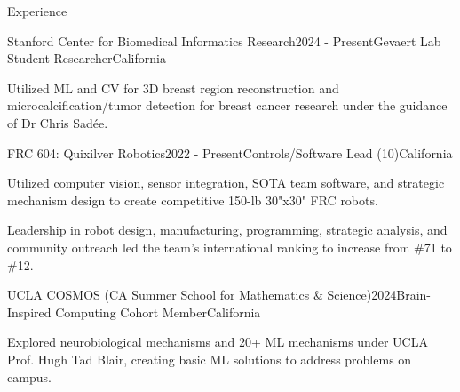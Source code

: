 \documentclass[
  11pt, %
]{resume}
\begin{document}
\sloppy


\begin{rSection}{Experience}


  \begin{rSubsection}{Stanford Center for Biomedical Informatics Research}{2024 - Present}{Gevaert Lab Student Researcher}{California}
    
    \item Utilized ML and CV for 3D breast region reconstruction and microcalcification/tumor detection for breast cancer research under the guidance of Dr Chris Sadée.
    
  \end{rSubsection}
        
  \begin{rSubsection}{FRC 604: Quixilver Robotics}{2022 - Present}{Controls/Software Lead (10)}{California}
    
    \item Utilized computer vision, sensor integration, SOTA team software, and strategic mechanism design to create competitive 150-lb 30"x30" FRC robots.
    
    \item Leadership in robot design, manufacturing, programming, strategic analysis, and community outreach led the team's international ranking to increase from \#71 to \#12.
    
  \end{rSubsection}
        
  \begin{rSubsection}{UCLA COSMOS (CA Summer School for Mathematics \& Science)}{2024}{Brain-Inspired Computing Cohort Member}{California}
    
    \item Explored neurobiological mechanisms and 20+ ML mechanisms under UCLA Prof. Hugh Tad Blair, creating basic ML solutions to address problems on campus.
    
  \end{rSubsection}
        
	
\end{rSection}

\end{document}
